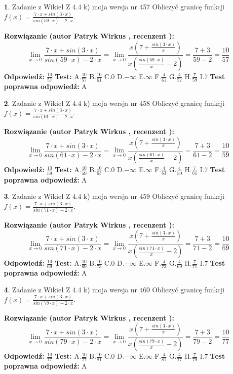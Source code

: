 \documentclass[12pt, a4paper]{article}
\theoremstyle{definition} %
\newtheorem{zad}{}
\newcommand{\zadStart}[1]{\begin{zad}#1\newline}
\newcommand{\zadStop}{\end{zad}}
\newcommand{\rozwStart}[2]{\noindent \textbf{Rozwiązanie (autor #1 , recenzent #2): }\newline}
\newcommand{\rozwStop}{\newline}
\newcommand{\odpStart}{\noindent \textbf{Odpowiedź:}\newline}
\newcommand{\odpStop}{\newline}
\newcommand{\testStart}{\noindent \textbf{Test:}\newline}
\newcommand{\testStop}{\newline}
\newcommand{\kluczStart}{\noindent \textbf{Test poprawna odpowiedź:}\newline}
\newcommand{\kluczStop}{\newline}
\begin{document}
\zadStart{Zadanie z Wikieł Z 4.4 k) moja wersja nr 457}
Obliczyć granicę funkcji $f(x)=\frac{7\cdot x +sin(3\cdot x)}{sin(59\cdot x) -2\cdot x}$.
\zadStop
\rozwStart{Patryk Wirkus}{}
$$\lim\limits_{x\to 0}\frac{7\cdot x +sin(3\cdot x)}{sin(59\cdot x) -2\cdot x}
=\lim\limits_{x\to 0}\frac{x(7+\frac{sin(3\cdot x)}{x})}{x(\frac{sin(59\cdot x)}{x}-2)}
=\frac{7+3}{59-2} = \frac{10}{57}$$
\rozwStop
\odpStart
$\frac{10}{57}$
\odpStop
\testStart
A.$\frac{10}{57}$
B.$\frac{10}{61}$
C.$0$
D.$-\infty$
E.$\infty$
F.$\frac{4}{61}$
G.$\frac{4}{57}$
H.$\frac{7}{59}$
I.$7$
\testStop
\kluczStart
A
\kluczStop



\zadStart{Zadanie z Wikieł Z 4.4 k) moja wersja nr 458}
Obliczyć granicę funkcji $f(x)=\frac{7\cdot x +sin(3\cdot x)}{sin(61\cdot x) -2\cdot x}$.
\zadStop
\rozwStart{Patryk Wirkus}{}
$$\lim\limits_{x\to 0}\frac{7\cdot x +sin(3\cdot x)}{sin(61\cdot x) -2\cdot x}
=\lim\limits_{x\to 0}\frac{x(7+\frac{sin(3\cdot x)}{x})}{x(\frac{sin(61\cdot x)}{x}-2)}
=\frac{7+3}{61-2} = \frac{10}{59}$$
\rozwStop
\odpStart
$\frac{10}{59}$
\odpStop
\testStart
A.$\frac{10}{59}$
B.$\frac{10}{63}$
C.$0$
D.$-\infty$
E.$\infty$
F.$\frac{4}{63}$
G.$\frac{4}{59}$
H.$\frac{7}{61}$
I.$7$
\testStop
\kluczStart
A
\kluczStop



\zadStart{Zadanie z Wikieł Z 4.4 k) moja wersja nr 459}
Obliczyć granicę funkcji $f(x)=\frac{7\cdot x +sin(3\cdot x)}{sin(71\cdot x) -2\cdot x}$.
\zadStop
\rozwStart{Patryk Wirkus}{}
$$\lim\limits_{x\to 0}\frac{7\cdot x +sin(3\cdot x)}{sin(71\cdot x) -2\cdot x}
=\lim\limits_{x\to 0}\frac{x(7+\frac{sin(3\cdot x)}{x})}{x(\frac{sin(71\cdot x)}{x}-2)}
=\frac{7+3}{71-2} = \frac{10}{69}$$
\rozwStop
\odpStart
$\frac{10}{69}$
\odpStop
\testStart
A.$\frac{10}{69}$
B.$\frac{10}{73}$
C.$0$
D.$-\infty$
E.$\infty$
F.$\frac{4}{73}$
G.$\frac{4}{69}$
H.$\frac{7}{71}$
I.$7$
\testStop
\kluczStart
A
\kluczStop



\zadStart{Zadanie z Wikieł Z 4.4 k) moja wersja nr 460}
Obliczyć granicę funkcji $f(x)=\frac{7\cdot x +sin(3\cdot x)}{sin(79\cdot x) -2\cdot x}$.
\zadStop
\rozwStart{Patryk Wirkus}{}
$$\lim\limits_{x\to 0}\frac{7\cdot x +sin(3\cdot x)}{sin(79\cdot x) -2\cdot x}
=\lim\limits_{x\to 0}\frac{x(7+\frac{sin(3\cdot x)}{x})}{x(\frac{sin(79\cdot x)}{x}-2)}
=\frac{7+3}{79-2} = \frac{10}{77}$$
\rozwStop
\odpStart
$\frac{10}{77}$
\odpStop
\testStart
A.$\frac{10}{77}$
B.$\frac{10}{81}$
C.$0$
D.$-\infty$
E.$\infty$
F.$\frac{4}{81}$
G.$\frac{4}{77}$
H.$\frac{7}{79}$
I.$7$
\testStop
\kluczStart
A
\kluczStop
\end{document}
